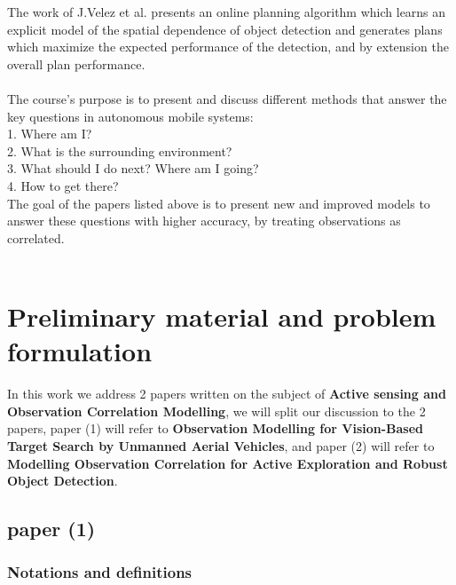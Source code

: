 \documentclass{article}
\begin{document}
	The work of J.Velez et al. presents an online planning algorithm which learns an explicit model of the spatial dependence of object detection and generates plans which maximize the expected performance of the detection, and by extension the overall plan performance. \\ \\	
	The course's purpose is to present and discuss different methods that answer the key questions in autonomous mobile systems: \\
	1. Where am I? \\
	2. What is the surrounding environment?\\
	3. What should I do next? Where am I going?\\
	4. How to get there?\\
	The goal of the papers listed above is to present new and improved models to answer these questions with higher accuracy, by treating observations as correlated. \\ \\
	
	\section{Preliminary material and problem formulation}
	In this work we address 2 papers written on the subject of \textbf{Active sensing and Observation Correlation Modelling},
	we will split our discussion to the 2 papers, paper (1) will refer to \textbf{Observation Modelling for Vision-Based Target Search by Unmanned Aerial Vehicles}, and paper (2) will refer to \textbf{Modelling Observation Correlation for Active Exploration and Robust Object Detection}.
	\subsection{paper (1)}
	
	\subsubsection{Notations and definitions}
	
\end{document}
